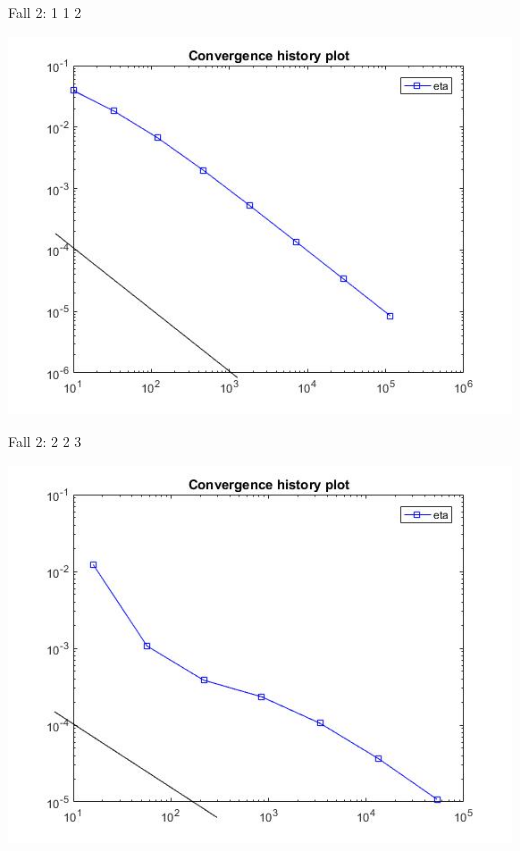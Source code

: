 \documentclass[xcolor=svgnames,ngerman]{beamer}
\begin{document}
				\begin{frame}{Fall 2: 1 1 2 }
\begin{center}
	\includegraphics[scale=0.3]{112.jpg}
\end{center}

	\end{frame}	
	
				\begin{frame}{Fall 2: 2 2 3}
\begin{center}
	\includegraphics[scale=0.3]{223.jpg}
\end{center}
	\end{frame}	
\end{document}
